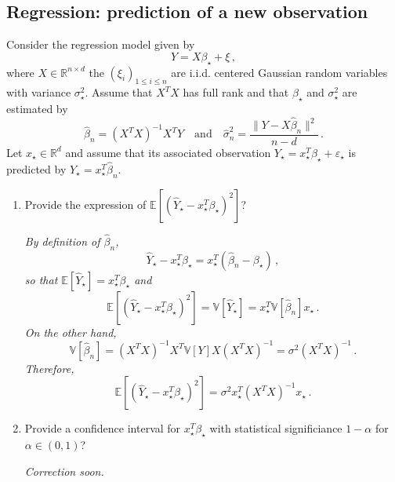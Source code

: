 \documentclass[a4paper,10pt,fleqn]{article}
\newcommand{\eqsp}{\,}
\newcommand{\rset}{\ensuremath{\mathbb{R}}}
\newcommand{\1}{\ensuremath{\mathbbm{1}}}
\newcommand{\bE}{\mathbb{E}}
\begin{document}
\subsection*{Regression: prediction of a new observation}
Consider the regression model given by
$$
Y = X\beta_{\star}+ \xi\eqsp,
$$
where $X\in\rset^{n\times d}$ the $(\xi_{i})_{1\leqslant i \leqslant n}$ are i.i.d. centered Gaussian random variables with variance $\sigma_{\star}^2$. Assume that $X^TX$ has full rank and that $\beta_\star$ and $\sigma_{\star}^2$ are estimated by 
$$
\widehat \beta_n = (X^TX)^{-1}X^TY\quad\mathrm{and}\quad \widehat \sigma^2_n =\frac{\|Y - X\widehat \beta_n \|^2}{n-d}\eqsp.
$$
Let $x_\star \in\rset^d$ and assume that its associated observation $Y_\star = x_\star^T\beta_\star + \varepsilon_\star$ is predicted by $\widehat Y_\star = x_\star^T\widehat \beta_n$.
\begin{enumerate}
\item  Provide the expression of $\bE[(\widehat Y_\star - x_\star^T\beta_\star)^2]$?

\vspace{.2cm}

{\em
By definition of $\widehat \beta_n $,
$$
\widehat Y_\star - x_\star^T\beta_\star = x_\star^T (\widehat\beta_n - \beta_\star)\,,
$$
so that $\bE[\widehat Y_\star] =  x_\star^T\beta_\star$ and
$$
\bE[(\widehat Y_\star - x_\star^T\beta_\star)^2] = \mathbb{V}[\widehat Y_\star] = x_\star^T \mathbb{V}[\widehat\beta_n]x_\star\,.
$$
On the other hand,
$$
\mathbb{V}[\widehat\beta_n] = (X^TX)^{-1}X^T \mathbb{V}[Y] X(X^TX)^{-1} = \sigma^2(X^TX)^{-1}\,.
$$
Therefore,
$$
\bE[(\widehat Y_\star - x_\star^T\beta_\star)^2] = \sigma^2x_\star^T(X^TX)^{-1}x_\star\,.
$$
}

\item  Provide a confidence interval for $x_\star^T\beta_\star$ with statistical significiance $1-\alpha$ for $\alpha\in(0,1)$?

\vspace{.2cm}

{\em
Correction soon.
}
\end{enumerate}
\end{document}
